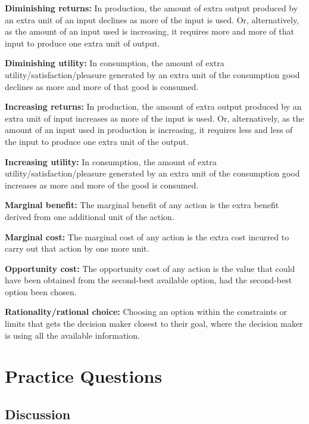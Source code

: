 \documentclass[
]{book}
\begin{document}
\textbf{Diminishing returns:} In production, the amount of extra output produced by an extra unit of an input declines as more of the input is used. Or, alternatively, as the amount of an input used is increasing, it requires more and more of that input to produce one extra unit of output.

\textbf{Diminishing utility:} In consumption, the amount of extra utility/satisfaction/pleasure generated by an extra unit of the consumption good declines as more and more of that good is consumed.

\textbf{Increasing returns:} In production, the amount of extra output produced by an extra unit of input increases as more of the input is used. Or, alternatively, as the amount of an input used in production is increasing, it requires less and less of the input to produce one extra unit of the output.

\textbf{Increasing utility:} In consumption, the amount of extra utility/satisfaction/pleasure generated by an extra unit of the consumption good increases as more and more of the good is consumed.

\textbf{Marginal benefit:} The marginal benefit of any action is the extra benefit derived from one additional unit of the action.

\textbf{Marginal cost:} The marginal cost of any action is the extra cost incurred to carry out that action by one more unit.

\textbf{Opportunity cost:} The opportunity cost of any action is the value that could have been obtained from the second-best available option, had the second-best option been chosen.

\textbf{Rationality/rational choice:} Choosing an option within the constraints or limits that gets the decision maker closest to their goal, where the decision maker is using all the available information.

\hypertarget{practice-questions-3}{%
\section{Practice Questions}\label{practice-questions-3}}

\hypertarget{discussion-3}{%
\subsection{Discussion}\label{discussion-3}}
\end{document}
